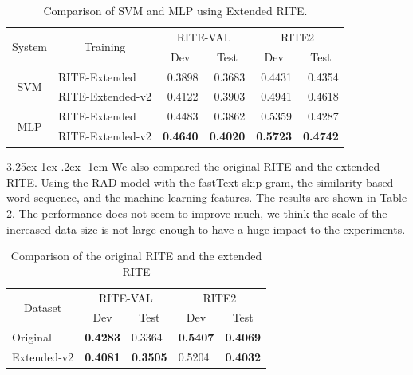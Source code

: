 \documentclass[12pt]{article}
\makeatletter
\renewcommand\paragraph{\@startsection{paragraph}{5}{\z@}%
  {3.25ex \@plus1ex \@minus.2ex}%
  {-1em}%
  {\normalfont\normalsize\bfseries}}
\makeatother
\begin{document}
\begin{CJK*}{UTF8}{bkai}
\begin{spacing}{1.77}
\begin{table}[H]
  \centering
  \setlength{\extrarowheight}{-3pt}
  \caption{Comparison of SVM and MLP using Extended RITE.}
  \label{result:ml_expand}
  \begin{tabular}{|c|l|r|r|r|r|}
  \hline
  \multirow{2}{*}{System} & \multicolumn{1}{c|}{\multirow{2}{*}{Training}} & \multicolumn{2}{c|}{RITE-VAL} & \multicolumn{2}{c|}{RITE2} \\ \cline{3-6}
   & \multicolumn{1}{c|}{} & \multicolumn{1}{c|}{Dev} & \multicolumn{1}{c|}{Test} & \multicolumn{1}{c|}{Dev} & \multicolumn{1}{c|}{Test} \\ \hline
  \multirow{2}{*}{SVM} & RITE-Extended & 0.3898 & 0.3683 & 0.4431 & 0.4354 \\ \cline{2-6}
   & RITE-Extended-v2 & 0.4122 & 0.3903 & 0.4941 & 0.4618 \\ \hline
  \multirow{2}{*}{MLP} & RITE-Extended & 0.4483 & 0.3862 & 0.5359 & 0.4287 \\ \cline{2-6}
   & RITE-Extended-v2 & \textbf{0.4640} & \textbf{0.4020} & \textbf{0.5723} & \textbf{0.4742} \\ \hline
  \end{tabular}
\end{table}

\paragraph{}
We also compared the original RITE and the extended RITE. Using the RAD model with the fastText skip-gram, the similarity-based word sequence, and the machine learning features. The results are shown in Table \ref{result:rite_extended}. The performance does not seem to improve much, we think the scale of the increased data size is not large enough to have a huge impact to the experiments.

\begin{table}[H]
  \centering
  \setlength{\extrarowheight}{-3pt}
  \caption{Comparison of the original RITE and the extended RITE}
  \label{result:rite_extended}
  \begin{tabular}{|l|l|l|l|l|}
  \hline
  \multicolumn{1}{|c|}{\multirow{2}{*}{Dataset}} & \multicolumn{2}{c|}{RITE-VAL} & \multicolumn{2}{c|}{RITE2} \\ \cline{2-5}
  \multicolumn{1}{|c|}{} & \multicolumn{1}{c|}{Dev} & \multicolumn{1}{c|}{Test} & \multicolumn{1}{c|}{Dev} & \multicolumn{1}{c|}{Test} \\ \hline
  Original & \textbf{0.4283} & 0.3364 & \textbf{0.5407} & \textbf{0.4069} \\ \hline
  Extended-v2 & \textbf{0.4081} & \textbf{0.3505} & 0.5204 & \textbf{0.4032} \\ \hline
  \end{tabular}
\end{table}


\end{spacing}
\end{CJK*}
\end{document}
